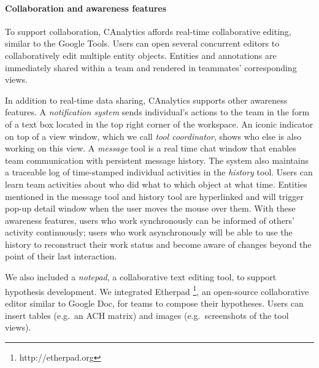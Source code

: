 \paragraph{Collaboration and awareness features}

To support collaboration, CAnalytics affords real-time collaborative editing, similar to the
Google Tools. Users can open several concurrent editors to
collaboratively edit multiple entity objects. Entities and annotations are immediately
shared within a team and rendered in teammates' corresponding views.

In addition to real-time data sharing, CAnalytics supports other awareness features. A \emph{notification system} sends
individual's actions to the team in the form of a text box located in the top
right corner of the workspace. An iconic
indicator on top of a view window, which we call \emph{tool coordinator}, shows who else is also working on this view. A \emph{message} tool is a real time chat window that enables team
communication with persistent message history. The system also maintains
a traceable log of time-stamped individual activities in the \emph{history} tool.
Users can learn team activities about who did what to which object at
what time. Entities mentioned in the message tool and
history tool are hyperlinked and will trigger pop-up detail window when
the user moves the mouse over them. With these awareness features, users who work
synchronously can be informed of others' activity continuously; users
who work asynchronously will be able to use the history to reconstruct
their work status and become aware of changes beyond the point of their
last interaction.

We also included a \emph{notepad}, a collaborative text editing tool, to support hypothesis
development. We integrated Etherpad \footnote{http://etherpad.org}, an
open-source collaborative editor similar to Google Doc, for teams to
compose their hypotheses. Users can insert tables (e.g.~an ACH matrix)
and images (e.g.~screenshots of the tool views).
